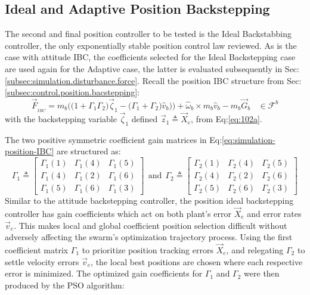 \subsection{Ideal and Adaptive Position Backstepping}
\label{subsec:simulation.position.pd}
The second and final position controller to be tested is the Ideal Backstabbing controller, the only exponentially stable position control law reviewed. As is the case with attitude IBC, the coefficients selected for the Ideal Backstepping case are used again for the Adaptive case, the latter is evaluated subsequently in Sec:\ref{subsec:simulation.disturbance.force}. Recall the position IBC structure from Sec:\ref{subsec:control.position.bacstepping}:
\begin{equation}\label{eq:simulation-position-IBC}
\vec{F}_{_{IBC}}=m_b\Big(\big(1+\Gamma_1\Gamma_2\big)\vec{\zeta}_1-\big(\Gamma_1+\Gamma_2\big)\hat{v}_b\big)\Big)+\hat{\omega}_b\times m_b\hat{v}_b-m_b\vec{G}_b~~~~\in\mathcal{F}^{b}
\end{equation}
with the backstepping variable $\vec{\zeta}_1$ defined $\vec{z}_1\triangleq \vec{X}_e$, from Eq:\ref{eq:102a}. 
\par
The two positive symmetric coefficient gain matrices in Eq:\ref{eq:simulation-position-IBC} are structured as:
\begin{equation}\label{eq:simulation-position-diagonal-coefficients}
\Gamma_1\triangleq \begin{bmatrix}
\Gamma_1(1) & \Gamma_1(4) & \Gamma_1(5)\\
\Gamma_1(4) & \Gamma_1(2) & \Gamma_1(6)\\
\Gamma_1(5) & \Gamma_1(6) & \Gamma_1(3)
\end{bmatrix}
~~\text{and}~~\Gamma_2\triangleq \begin{bmatrix}
\Gamma_2(1) & \Gamma_2(4) & \Gamma_2(5)\\
\Gamma_2(4) & \Gamma_2(2) & \Gamma_2(6)\\
\Gamma_2(5) & \Gamma_2(6) & \Gamma_2(3)
\end{bmatrix}
\end{equation}
Similar to the attitude backstepping controller, the position ideal backstepping controller has gain coefficients which act on both plant's error $\vec{X}_e$ and error rates $\vec{v}_e$. This makes local and global coefficient position selection difficult without adversely affecting the swarm's optimization trajectory process. Using the first coefficient matrix $\Gamma_1$ to prioritize position tracking errors $\vec{X}_e$, and relegating $\Gamma_2$ to settle velocity errors $\vec{v}_e$, the local best positions are chosen where each respective error is minimized. The optimized gain coefficients for $\Gamma_1$ and $\Gamma_2$ were then produced by the PSO algorithm:
